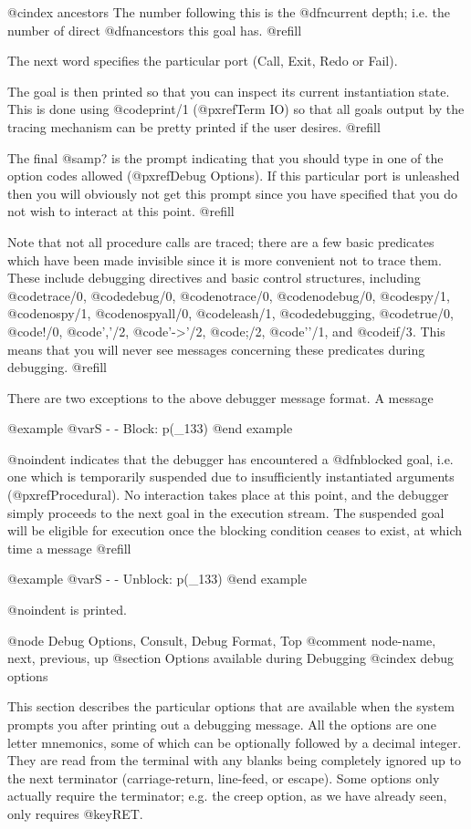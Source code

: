@cindex ancestors
The number following this is the @dfn{current depth}; i.e. the number
of direct @dfn{ancestors} this goal has. @refill

The next word specifies the particular port (Call, Exit, Redo or Fail).

The goal is then printed so that you can inspect its current instantiation
state.  This is done using @code{print/1} (@pxref{Term IO}) so that all goals
output by the tracing mechanism can be pretty printed if the user
desires. @refill

The final @samp{?} is the prompt indicating that you should type in one of the
option codes allowed (@pxref{Debug Options}).  If this particular port is
unleashed then you will obviously not get this prompt since you have
specified that you do not wish to interact at this point. @refill

Note that not all procedure calls are traced; there are a few basic
predicates which have been made invisible since it is more convenient
not to trace them.  These include debugging directives and basic control
structures, including @code{trace/0}, @code{debug/0}, @code{notrace/0},
@code{nodebug/0}, @code{spy/1}, @code{nospy/1}, @code{nospyall/0},
@code{leash/1}, @code{debugging}, @code{true/0}, @code{!/0},
@code{','/2}, @code{'->'/2}, @code{;/2}, @code{'\+'/1}, and @code{if/3}.
This means that you will never see messages concerning these predicates
during debugging. @refill

There are two exceptions to the above debugger message format.  A message

@example
@var{S} -  -  Block: p(_133)
@end example

@noindent
indicates that the debugger has encountered a @dfn{blocked} goal, i.e.
one which is temporarily suspended due to insufficiently instantiated
arguments (@pxref{Procedural}).  No interaction takes place at this
point, and the debugger simply proceeds to the next goal in the
execution stream.  The suspended goal will be eligible for execution
once the blocking condition ceases to exist, at which time a message
@refill

@example
@var{S} -  -  Unblock: p(_133)
@end example

@noindent
is printed.

@node Debug Options, Consult, Debug Format, Top
@comment  node-name,  next,  previous,  up
@section Options available during Debugging
@cindex debug options

This section describes the particular options that are available when the
system prompts you after printing out a debugging message.  All the options
are one letter mnemonics, some of which can be optionally followed by a
decimal integer.  They are read from the terminal with any blanks being
completely ignored up to the next terminator (carriage-return, line-feed,
or escape).  Some options only actually require the terminator; e.g. the
creep option, as we have already seen, only requires @key{RET}.

